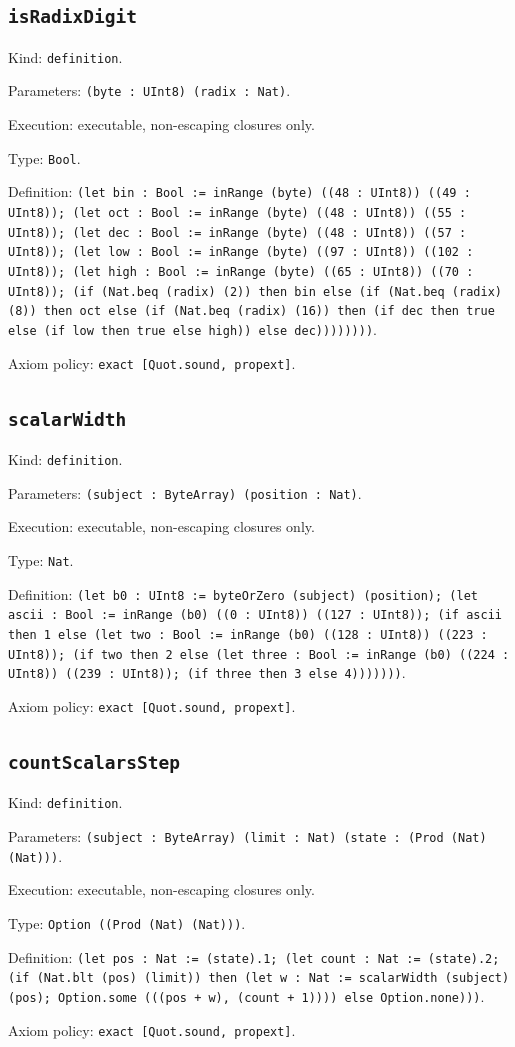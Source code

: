 \documentclass[11pt]{article}
\begin{document}
\subsection*{\texttt{isRadixDigit}}
\noindent Kind: \texttt{definition}.\par
\noindent Parameters: \texttt{(byte : UInt8) (radix : Nat)}.\par
\noindent Execution: executable, non-escaping closures only.\par
\noindent Type: \texttt{Bool}.\par
\noindent Definition: \texttt{(let bin : Bool := inRange (byte) ((48 : UInt8)) ((49 : UInt8)); (let oct : Bool := inRange (byte) ((48 : UInt8)) ((55 : UInt8)); (let dec : Bool := inRange (byte) ((48 : UInt8)) ((57 : UInt8)); (let low : Bool := inRange (byte) ((97 : UInt8)) ((102 : UInt8)); (let high : Bool := inRange (byte) ((65 : UInt8)) ((70 : UInt8)); (if (Nat.beq (radix) (2)) then bin else (if (Nat.beq (radix) (8)) then oct else (if (Nat.beq (radix) (16)) then (if dec then true else (if low then true else high)) else dec))))))))}.\par
\noindent Axiom policy: \texttt{exact [Quot.sound, propext]}.\par
\subsection*{\texttt{scalarWidth}}
\noindent Kind: \texttt{definition}.\par
\noindent Parameters: \texttt{(subject : ByteArray) (position : Nat)}.\par
\noindent Execution: executable, non-escaping closures only.\par
\noindent Type: \texttt{Nat}.\par
\noindent Definition: \texttt{(let b0 : UInt8 := byteOrZero (subject) (position); (let ascii : Bool := inRange (b0) ((0 : UInt8)) ((127 : UInt8)); (if ascii then 1 else (let two : Bool := inRange (b0) ((128 : UInt8)) ((223 : UInt8)); (if two then 2 else (let three : Bool := inRange (b0) ((224 : UInt8)) ((239 : UInt8)); (if three then 3 else 4)))))))}.\par
\noindent Axiom policy: \texttt{exact [Quot.sound, propext]}.\par
\subsection*{\texttt{countScalarsStep}}
\noindent Kind: \texttt{definition}.\par
\noindent Parameters: \texttt{(subject : ByteArray) (limit : Nat) (state : (Prod (Nat) (Nat)))}.\par
\noindent Execution: executable, non-escaping closures only.\par
\noindent Type: \texttt{Option ((Prod (Nat) (Nat)))}.\par
\noindent Definition: \texttt{(let pos : Nat := (state).1; (let count : Nat := (state).2; (if (Nat.blt (pos) (limit)) then (let w : Nat := scalarWidth (subject) (pos); Option.some (((pos + w), (count + 1)))) else Option.none)))}.\par
\noindent Axiom policy: \texttt{exact [Quot.sound, propext]}.\par
\end{document}
